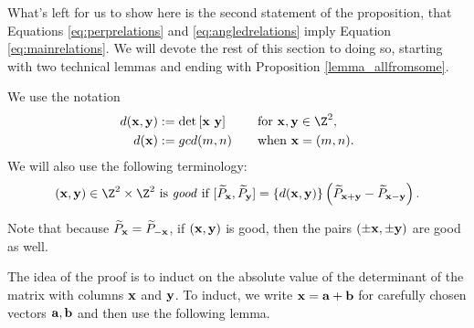 What's left for us to show here is the second statement of the proposition, that Equations \eqref{eq:perprelations} and \eqref{eq:angledrelations} imply Equation \eqref{eq:mainrelations}. We will devote the rest of this section to doing so, starting with two technical lemmas and ending with Proposition \ref{lemma_allfromsome}. 

We use the notation
\begin{align*} 
d(\xx, \yy) &:= \det\left[\xx\,\, \yy\right] \quad \quad \,\,  \textrm{for } \xx, \yy \in \Z^2, \\
d(\xx) &:= gcd(m,n) \quad \quad \textrm{when } \xx = (m,n).
\end{align*} 
We will also use the following terminology: 
\[
(\xx,\yy) \in \Z^2 \times \Z^2 \textrm{ is \emph{good} if  } [\widetilde{P}_\xx,\widetilde{P}_\yy] = \{d(\xx,\yy)\} \left( \widetilde{P}_{\xx+\yy}-\widetilde{P}_{\xx-\yy} \right).
\]

\begin{remark}\label{remark_goodsymmetry}
Note that because $\widetilde{P}_{{\mathbf{x}}}=\widetilde{P}_{-{\mathbf{x}}}$, if $({\mathbf{x}}, {\mathbf{y}})$ is good, then the pairs $(\pm{\mathbf{x}}, \pm{\mathbf{y}})$ are good as well. 
\end{remark}

The idea of the proof is to induct on the absolute value of the determinant of the matrix with columns ${\mathbf{x}}$ and ${\mathbf{y}}$. To induct, we write ${\mathbf{x}} = {\mathbf{a}} + {\mathbf{b}}$ for carefully chosen vectors ${\mathbf{a}}, {\mathbf{b}}$ and then use the following lemma. 

